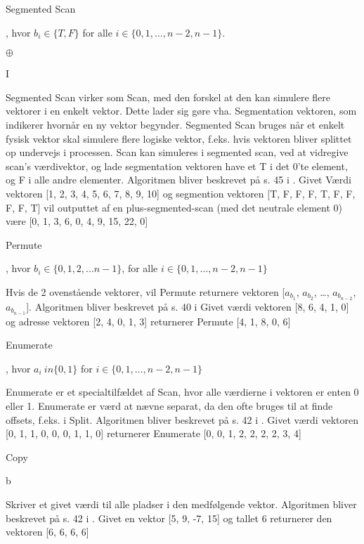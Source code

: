 \modelDesc
{Segmented Scan}
{
\item[Værdi vektor:][$a_0$, $a_1$, \ldots , $a_{n-2}$, $a_{n-1}$]
\item[Segmentation Vektor:] [$b_0$, $b_1$, \ldots, $b_{n-2}$, $b_{n-1}$], hvor $b_i \in \{T, F\}$ for alle $i \in \{0, 1, \ldots, n-2, n-1 \}$.
\item[Associativ binær operator:] $\oplus$
\item[Neutralt element:] I
}
{
Segmented Scan virker som Scan, med den forskel at den kan simulere flere vektorer i en enkelt vektor. Dette lader sig gøre vha. Segmentation vektoren, som indikerer hvornår en ny vektor begynder. Segmented Scan bruges når et enkelt fysisk vektor skal simulere flere logiske vektor, f.eks. hvis vektoren bliver splittet op undervejs i processen. Scan kan simuleres i segmented scan, ved at vidregive scan's værdivektor, og lade segmentation vektoren have et T i det 0'te element, og F i alle andre elementer. Algoritmen bliver beskrevet på s. 45 i \cite{ble}.
}
{
Givet Værdi vektoren [1, 2, 3, 4, 5, 6, 7, 8, 9, 10] og segmention vektoren [T, F, F, F, T, F, F, F, F, T] vil outputtet af en plus-segmented-scan (med det neutrale element 0) være [0, 1, 3, 6, 0, 4, 9, 15, 22, 0]
}

\modelDesc
{Permute}
{
\item[Værdi vektor:][$a_0$, $a_1$, \ldots , $a_{n-2}$, $a_{n-1}$]
\item[Adresse vektor:][$b_0$, $b_1$, \ldots , $b_{n-2}$, $b_{n-1}$], hvor $b_i \in \{ 0, 1, 2, \ldots n - 1\}$, for alle $i \in \{0, 1, \ldots, n-2, n-1\}$
}
{
Hvis de 2 ovenstående vektorer, vil Permute returnere vektoren [$a_{b_1}$, $a_{b_2}$, \ldots, $a_{b_{n-2}}$, $a_{b_{n-1}}$]. Algoritmen bliver beskrevet på s. 40 i \cite{ble}
}
{
Givet værdi vektoren [8, 6, 4, 1, 0] og adresse vektoren [2, 4, 0, 1, 3] returnerer Permute [4, 1, 8, 0, 6]
}

\modelDesc
{Enumerate}
{
\item[Værdi vektor:][$a_0$, $a_1$, \ldots , $a_{n-2}$, $a_{n-1}$], hvor $a_i \ in \{0, 1\}$ for $i \in \{0, 1, \ldots, n-2, n-1 \}$
}
{
Enumerate er et specialtilfældet af Scan, hvor alle værdierne i vektoren er enten 0 eller 1. Enumerate er værd at nævne separat, da den ofte bruges til at finde offsets, f.eks. i Split. Algoritmen bliver beskrevet på s. 42 i \cite{ble}.
}
{
Givet værdi vektoren [0, 1, 1, 0, 0, 0, 1, 1, 0] returnerer Enumerate [0, 0, 1, 2, 2, 2, 2, 3, 4]
}


\modelDesc
{Copy}
{
\item[Vektor der skal skrives til:] [$a_0$, $a_1$, \ldots , $a_{n-2}$, $a_{n-1}$]
\item[Værdi der skal skrives til vektoren:] b
}
{
Skriver et givet værdi til alle pladser i den medfølgende vektor. Algoritmen bliver beskrevet på s. 42 i \cite{ble}.
}
{
Givet en vektor [5, 9, -7, 15] og tallet 6 returnerer den vektoren [6, 6, 6, 6]
}

